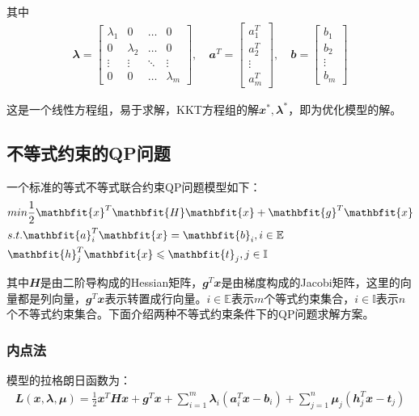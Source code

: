 其中
\begin{align}
  \mathbfit{\lambda}=\begin{bmatrix}
    \lambda_1 & 0 & \dots & 0\\
    0 & \lambda_2 & \dots & 0\\
    \vdots & \vdots &\ddots & \vdots\\
    0 & 0 &\dots & \lambda_m
  \end{bmatrix}, \quad
  \mathbfit{a}^T=\begin{bmatrix}
    a_1^T \\ a_2^T \\ \vdots \\ a_m^T
  \end{bmatrix}, \quad
  \mathbfit{b}=\begin{bmatrix}
    b_1 \\ b_2 \\ \vdots \\ b_m 
  \end{bmatrix}
\end{align}

这是一个线性方程组，易于求解，KKT方程组的解$\mathbfit{x}^*, \mathbfit{\lambda}^*$，即为优化模型的解。

\subsection{不等式约束的QP问题}

一个标准的等式不等式联合约束QP问题模型如下：
\begin{align}
  &min \quad \frac{1}{2}\mathbfit{x}^T\mathbfit{H}\mathbfit{x}+\mathbfit{g}^T\mathbfit{x} \notag\\
  &s.t. \quad \mathbfit{a}_i^T\mathbfit{x}=\mathbfit{b}_i, \quad i \in \mathbb{E}\\
  &\quad \mathbfit{h}_j^T\mathbfit{x}\leq\mathbfit{t}_j, \quad j \in \mathbb{I} 
\end{align}

其中$\mathbfit{H}$是由二阶导构成的Hessian矩阵，$\mathbfit{g}^T\mathbfit{x}$是由梯度构成的Jacobi矩阵，这里的向量都是列向量，$\mathbfit{g}^T\mathbfit{x}$表示转置成行向量。$i \in \mathbb{E}$表示$m$个等式约束集合，$i \in \mathbb{I}$表示$n$个不等式约束集合。下面介绍两种不等式约束条件下的QP问题求解方案。
\subsubsection{内点法}
模型的拉格朗日函数为：
\begin{align}
  \mathbfit{L}(\mathbfit{x},\mathbfit{\lambda}, \mathbfit{\mu})=\frac{1}{2}\mathbfit{x}^T\mathbfit{H}\mathbfit{x}+\mathbfit{g}^T\mathbfit{x}+\sum_{i=1}^{m}\mathbfit{\lambda}_i(\mathbfit{a}_i^T\mathbfit{x}-\mathbfit{b}_i)+\sum_{j=1}^{n}\mathbfit{\mu}_j(\mathbfit{h}_j^T\mathbfit{x}-\mathbfit{t}_j)
\end{align}

